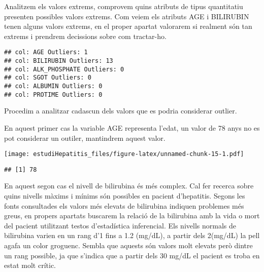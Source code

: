 \documentclass[]{article}
\newenvironment{Shaded}{\begin{snugshade}}{\end{snugshade}}
\newcommand{\CharTok}[1]{\textcolor[rgb]{0.31,0.60,0.02}{#1}}
\newcommand{\ControlFlowTok}[1]{\textcolor[rgb]{0.13,0.29,0.53}{\textbf{#1}}}
\newcommand{\KeywordTok}[1]{\textcolor[rgb]{0.13,0.29,0.53}{\textbf{#1}}}
\newcommand{\NormalTok}[1]{#1}
\newcommand{\OperatorTok}[1]{\textcolor[rgb]{0.81,0.36,0.00}{\textbf{#1}}}
\newcommand{\StringTok}[1]{\textcolor[rgb]{0.31,0.60,0.02}{#1}}
\begin{document}
Analitzem els valors extrems, comprovem quins atributs de tipus
quantitatiu presenten possibles valors extrems. Com veiem els atributs
AGE i BILIRUBIN tenen alguns valors extrems, en el proper apartat
valorarem si realment són tan extrems i prendrem decissions sobre com
tractar-ho.

\begin{Shaded}
\end{Shaded}

\begin{verbatim}
## col: AGE Outliers: 1 
## col: BILIRUBIN Outliers: 13 
## col: ALK_PHOSPHATE Outliers: 0 
## col: SGOT Outliers: 0 
## col: ALBUMIN Outliers: 0 
## col: PROTIME Outliers: 0
\end{verbatim}

Procedim a analitzar cadascun dels valors que es podria considerar
outlier.

En aquest primer cas la variable AGE representa l'edat, un valor de 78
anys no es pot considerar un outiler, mantindrem aquest valor.

\begin{Shaded}
\end{Shaded}

\texttt{[image: estudiHepatitis\_files/figure-latex/unnamed-chunk-15-1.pdf]}

\begin{Shaded}
\end{Shaded}

\begin{verbatim}
## [1] 78
\end{verbatim}

En aquest segon cas el nivell de bilirubina és més complex. Cal fer
recerca sobre quins nivells màxims i mínims són possibles en pacient
d'hepatitis. Segons les fonts consultades els valors més elevats de
bilirubina indiquen problemes més greus, en propers apartats buscarem la
relació de la bilirubina amb la vida o mort del pacient utilitzant
testos d'estadística inferencial. Els nivells normals de bilirubina
varien en un rang d'1 fins a 1.2 (mg/dL), a partir dels 2(mg/dL) la pell
agafa un color groguenc. Sembla que aquests són valors molt elevats però
dintre un rang possible, ja que s'indica que a partir dels 30 mg/dL el
pacient es troba en estat molt crític.\\
\end{document}
